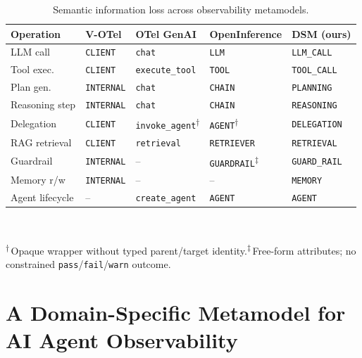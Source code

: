 \documentclass[sigconf,nonacm]{acmart}
\begin{document}
\begin{table}[h]
\centering
\caption{Semantic information loss across observability metamodels.}
\label{tab:gap}
\footnotesize
\begin{tabular}{p{1.55cm} p{1.05cm} p{1.25cm} p{1.25cm} p{1.4cm}}
\toprule
\textbf{Operation} & \textbf{V-OTel} & \textbf{OTel GenAI} & \textbf{Open\-Inference} & \textbf{DSM (ours)} \\
\midrule
LLM call        & \texttt{CLIENT}   & \texttt{chat}            & \texttt{LLM}       & \texttt{LLM\_CALL} \\
Tool exec.      & \texttt{CLIENT}   & \texttt{execute\_tool}   & \texttt{TOOL}      & \texttt{TOOL\_CALL} \\
Plan gen.       & \texttt{INTERNAL} & \texttt{chat}            & \texttt{CHAIN}     & \texttt{PLANNING} \\
Reasoning step  & \texttt{INTERNAL} & \texttt{chat}            & \texttt{CHAIN}     & \texttt{REASONING} \\
Delegation      & \texttt{CLIENT}   & \texttt{invoke\_agent}\textsuperscript{$\dagger$} & \texttt{AGENT}\textsuperscript{$\dagger$} & \texttt{DELEGATION} \\
RAG retrieval   & \texttt{CLIENT}   & \texttt{retrieval}       & \texttt{RETRIEVER} & \texttt{RETRIEVAL} \\
Guardrail       & \texttt{INTERNAL} & --                       & \texttt{GUARDRAIL}\textsuperscript{$\ddagger$} & \texttt{GUARD\_RAIL} \\
Memory r/w      & \texttt{INTERNAL} & --                       & --                 & \texttt{MEMORY} \\
Agent lifecycle & --                & \texttt{create\_agent}   & \texttt{AGENT}     & \texttt{AGENT} \\
\bottomrule
\end{tabular}
\\
\raggedright\textsuperscript{$\dagger$}\,Opaque wrapper without typed parent/target identity.\quad\textsuperscript{$\ddagger$}\,Free-form attributes; no constrained \texttt{pass}/\texttt{fail}/\texttt{warn} outcome.
\end{table}

\section{A Domain-Specific Metamodel for AI Agent Observability}
\label{sec:dsm}
\end{document}
